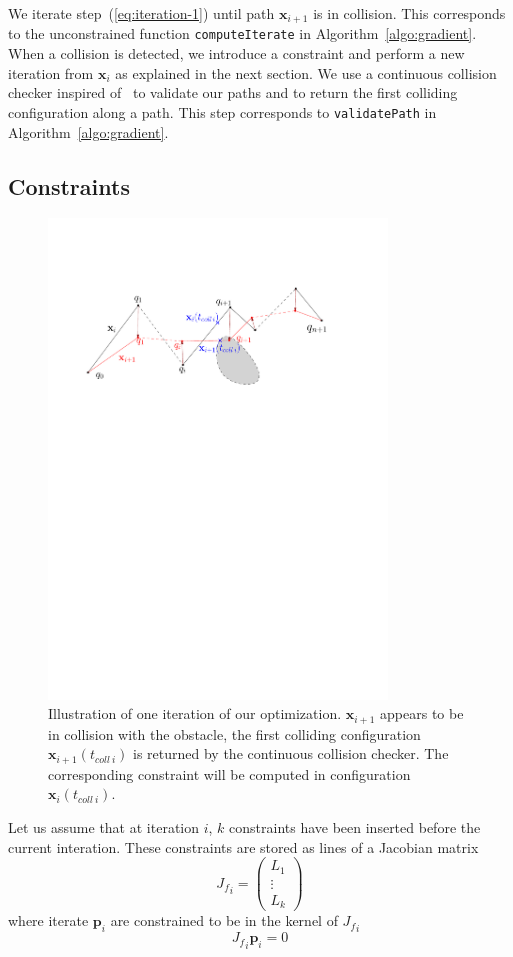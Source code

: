 \documentclass{tADR2e}
\newcommand\p{\mathbf{p}}
\newcommand\xx{\mathbf{x}} %
\newcommand\tcolli{t_{coll\ i}}
\newcommand\Jf{{J_f}}
\begin{document}
We iterate step~(\ref{eq:iteration-1}) until path $\xx_{i+1}$ is in collision. This 
corresponds to the unconstrained function \texttt{computeIterate} in 
Algorithm~\ref{algo:gradient}.
When a collision is detected, we introduce a constraint and perform a new 
iteration from $\xx_i$ as explained in the next section. We use a continuous 
collision checker inspired of~\cite{SchwarzerExactCollision} to validate our 
paths and to return the first colliding configuration along a path. This step corresponds to \texttt{validatePath} in Algorithm~\ref{algo:gradient}.

\subsection{Constraints}

\begin{figure}[t]
	\centering
	\includegraphics[width=9cm]{optim_grad.pdf}
	\caption{Illustration of one iteration of our optimization. $\xx_{i+1}$ 
	appears 
	to be in collision with the obstacle, the first colliding configuration 
	$\xx_{i+1}(\tcolli)$ is returned by the continuous collision checker. The corresponding constraint will be computed in configuration $\xx_{i}(\tcolli)$.}
	\label{optim_grad}
\end{figure}

Let us assume that at iteration $i$, $k$ constraints have been inserted before the current interation. These constraints are stored as lines of a Jacobian matrix
$$
\Jf_{i} = \left(\begin{array}{c}L_1 \\ \vdots \\ L_k\end{array}\right)
$$
where iterate $\p_i$ are constrained to be in the kernel of $\Jf_{i}$
$$
\Jf_{i} \p_i = 0
$$
\end{document}
